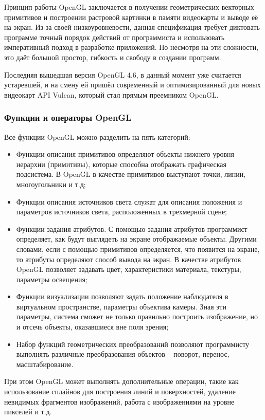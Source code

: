 Принцип работы  OpenGL заключается в получении геометрических векторных примитивов и построении растровой картинки в памяти видеокарты и выводе её на экран. Из-за своей низкоуровневости, данная спецификация требует диктовать программе точный порядок действий от программиста и использовать императивный подход в разработке приложений. Но несмотря на эти сложности, это даёт большой простор, гибкость и свободу в создании программ.

Последняя вышедшая версия OpenGL 4.6, в данный момент уже считается устаревшей, и на смену ей пришёл современный и оптимизированный для новых видеокарт API Vulcan, который стал прямым преемником OpenGL.

\subsubsection{Функции и операторы OpenGL}
Все функции OpenGL можно разделить на пять категорий:
\begin{itemize}
	\item Функции описания примитивов определяют объекты нижнего уровня иерархии (примитивы), которые способна отображать графическая подсистема. В OpenGL в качестве примитивов выступают точки, линии, многоугольники и т.д;
	\item Функции описания источников света служат для описания положения и параметров источников света, расположенных в трехмерной сцене;
	\item Функции задания атрибутов. С помощью задания атрибутов программист определяет, как будут выглядеть на экране отображаемые объекты. Другими словами, если с помощью примитивов определяется, что появится на экране, то атрибуты определяют способ вывода на экран. В качестве атрибутов OpenGL позволяет задавать цвет, характеристики материала, текстуры, параметры освещения;
	\item Функции визуализации позволяют задать положение наблюдателя в виртуальном пространстве, параметры объектива камеры. Зная эти параметры, система сможет не только правильно построить изображение, но и отсечь объекты, оказавшиеся вне поля зрения;
	\item Набор функций геометрических преобразований позволяют программисту выполнять различные преобразования объектов – поворот, перенос, масштабирование.
\end{itemize}

При этом OpenGL может выполнять дополнительные операции, такие как использование сплайнов для построения линий и поверхностей, удаление невидимых фрагментов изображений, работа с изображениями на уровне пикселей и т.д.

